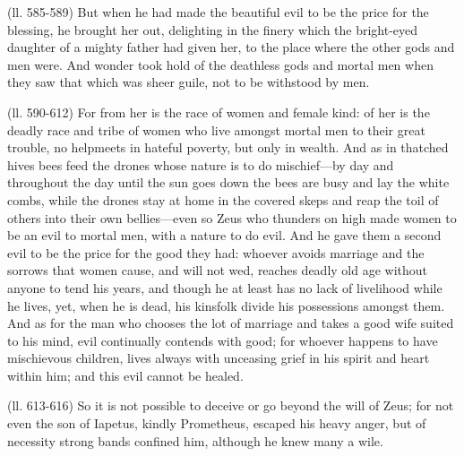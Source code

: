 (ll. 585-589) But when he had made the beautiful evil to be the price for the
blessing, he brought her out, delighting in the finery which the bright-eyed
daughter of a mighty father had given her, to the place where the other gods
and men were. And wonder took hold of the deathless gods and mortal men when
they saw that which was sheer guile, not to be withstood by men.

(ll. 590-612) For from her is the race of women and female kind: of her is the
deadly race and tribe of women who live amongst mortal men to their great
trouble, no helpmeets in hateful poverty, but only in wealth. And as in
thatched hives bees feed the drones whose nature is to do mischief—by day
and throughout the day until the sun goes down the bees are busy and lay the
white combs, while the drones stay at home in the covered skeps and reap the
toil of others into their own bellies—even so Zeus who thunders on high
made women to be an evil to mortal men, with a nature to do evil. And he gave
them a second evil to be the price for the good they had: whoever avoids
marriage and the sorrows that women cause, and will not wed, reaches deadly old
age without anyone to tend his years, and though he at least has no lack of
livelihood while he lives, yet, when he is dead, his kinsfolk divide his
possessions amongst them. And as for the man who chooses the lot of marriage
and takes a good wife suited to his mind, evil continually contends with good;
for whoever happens to have mischievous children, lives always with unceasing
grief in his spirit and heart within him; and this evil cannot be healed.

(ll. 613-616) So it is not possible to deceive or go beyond the will of Zeus;
for not even the son of Iapetus, kindly Prometheus, escaped his heavy anger,
but of necessity strong bands confined him, although he knew many a wile.

